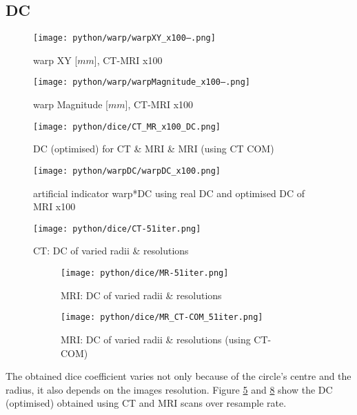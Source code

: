 \clearpage

\subsection{DC}

\begin{figure}[!bp]
  \centering
  \texttt{[image: python/warp/warpXY\_x100--.png]}
  \caption{warp XY [$mm$], CT-MRI x100}
  \label{fig:warpXY_x100}
\end{figure}

\begin{figure}[!tp]
    \centering
    \texttt{[image: python/warp/warpMagnitude\_x100--.png]}
    \caption{warp Magnitude [$mm$], CT-MRI x100}
    \label{fig:warpMagnitude_x100}
\end{figure}
\begin{figure}[!bp]
    \centering
    \texttt{[image: python/dice/CT\_MR\_x100\_DC.png]}
    \caption{DC (optimised) for CT \& MRI \& MRI (using CT COM)}
    \label{fig:CT_MR_x100_DC}
\end{figure}

\begin{figure}[!tp]
    \centering
    \texttt{[image: python/warpDC/warpDC\_x100.png]}
    \caption{artificial indicator warp*DC using real DC and optimised DC of MRI x100}
    \label{fig:warpDC_x100}
\end{figure}
\begin{figure}[!bp]
  \centering
  \texttt{[image: python/dice/CT-51iter.png]}
  \caption{CT: DC of varied radii \& resolutions}
  \label{fig:CT_dc}
\end{figure}

\begin{figure}[!tbp]
  \begin{subfigure}[b]{\textwidth}
    \centering
    \texttt{[image: python/dice/MR-51iter.png]}
    \caption{MRI: DC of varied radii \& resolutions}
    \label{fig:MR_dc-opti}
  \end{subfigure}
  \begin{subfigure}[!b]{\textwidth}
    \centering
    \texttt{[image: python/dice/MR\_CT-COM\_51iter.png]}
    \caption{MRI: DC of varied radii \& resolutions (using CT-COM)}
    \label{fig:MR_CT-COM_dc-opti}
  \end{subfigure}
  \caption{}
  \label{fig:MR_dc}
\end{figure}


The obtained dice coefficient varies not only because of the circle's centre and the radius, it also depends on the images resolution.
Figure \ref{fig:CT_dc} and \ref{fig:MR_dc} show the DC (optimised) obtained using CT and MRI scans over resample rate.

